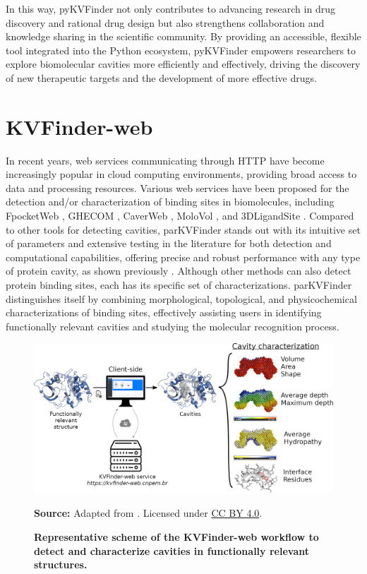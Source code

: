 \documentclass[Ingles]{phdthesis}
\begin{document}
In this way, pyKVFinder not only contributes to advancing research in drug discovery and rational drug design but also strengthens collaboration and knowledge sharing in the scientific community. By providing an accessible, flexible tool integrated into the Python ecosystem, pyKVFinder empowers researchers to explore biomolecular cavities more efficiently and effectively, driving the discovery of new therapeutic targets and the development of more effective drugs.

\section{KVFinder-web}

In recent years, web services communicating through \ac{HTTP} have become increasingly popular in cloud computing environments, providing broad access to data and processing resources. Various web services have been proposed for the detection and/or characterization of binding sites in biomolecules, including FpocketWeb \cite{fpocketweb}, GHECOM \cite{ghecom}, CaverWeb \cite{caverweb}, MoloVol \cite{molovol}, and 3DLigandSite \cite{3dligandsite}. Compared to other tools for detecting cavities, parKVFinder stands out with its intuitive set of parameters and extensive testing in the literature for both detection and computational capabilities, offering precise and robust performance with any type of protein cavity, as shown previously \cite{guerra2019,guerra2020, guerra2021}. Although other methods can also detect protein binding sites, each has its specific set of characterizations. parKVFinder distinguishes itself by combining morphological, topological, and physicochemical characterizations of binding sites, effectively assisting users in identifying functionally relevant cavities and studying the molecular recognition process.

\begin{figure}[ht]
  \centering
  \includegraphics[scale=1.6]{images/kvweb-overview.png}
  \centerline{\tiny{\textbf{Source:} Adapted from \cite{guerra2023A}. Licensed under \href{https://creativecommons.org/licenses/by/4.0/}{CC BY 4.0}.}}
  \caption[Representative scheme of the KVFinder-web workflow to detect and characterize cavities in functionally relevant structures]{\textbf{Representative scheme of the KVFinder-web workflow to detect and characterize cavities in functionally relevant structures.}}
  \label{fig:kvweb-overview}
\end{figure}
\end{document}
